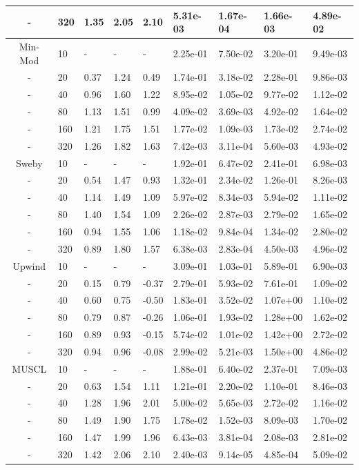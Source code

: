 \begin{table}[htbp]
{\begin{tabular}{cllllllll}
    -  & 320 & 1.35 & 2.05 & 2.10 &  5.31e-03 & 1.67e-04 & 1.66e-03 & 4.89e-02\\ 
   \hline
    Min-Mod &  10 & - & - & - &  2.25e-01 & 7.50e-02 & 3.20e-01 & 9.49e-03\\ 
    - &  20 & 0.37 & 1.24 & 0.49 &  1.74e-01 & 3.18e-02 & 2.28e-01 & 9.86e-03\\ 
    - &  40 & 0.96 & 1.60 & 1.22 &  8.95e-02 & 1.05e-02 & 9.77e-02 & 1.12e-02\\ 
    - &  80 & 1.13 & 1.51 & 0.99 &  4.09e-02 & 3.69e-03 & 4.92e-02 & 1.64e-02\\ 
    - & 160 & 1.21 & 1.75 & 1.51 &  1.77e-02 & 1.09e-03 & 1.73e-02 & 2.74e-02\\ 
    - & 320 & 1.26 & 1.82 & 1.63 &  7.42e-03 & 3.11e-04 & 5.60e-03 & 4.93e-02\\ 
   \hline
    Sweby &  10 & - & - & - &  1.92e-01 & 6.47e-02 & 2.41e-01 & 6.98e-03\\ 
    - &  20 & 0.54 & 1.47 & 0.93 &  1.32e-01 & 2.34e-02 & 1.26e-01 & 8.26e-03\\ 
    - &  40 & 1.14 & 1.49 & 1.09 &  5.97e-02 & 8.34e-03 & 5.94e-02 & 1.11e-02\\ 
    - &  80 & 1.40 & 1.54 & 1.09 &  2.26e-02 & 2.87e-03 & 2.79e-02 & 1.65e-02\\ 
    - & 160 & 0.94 & 1.55 & 1.06 &  1.18e-02 & 9.84e-04 & 1.34e-02 & 2.80e-02\\ 
    - & 320 & 0.89 & 1.80 & 1.57 &  6.38e-03 & 2.83e-04 & 4.50e-03 & 4.96e-02\\ 
   \hline
    Upwind &  10 & - & - & - &  3.09e-01 & 1.03e-01 & 5.89e-01 & 6.90e-03\\ 
    - &  20 & 0.15 & 0.79 & -0.37&  2.79e-01 & 5.93e-02 & 7.61e-01 & 1.09e-02\\ 
    - &  40 & 0.60 & 0.75 & -0.50&  1.83e-01 & 3.52e-02 & 1.07e+00 & 1.10e-02\\ 
    - &  80 & 0.79 & 0.87 & -0.26&  1.06e-01 & 1.93e-02 & 1.28e+00 & 1.62e-02\\ 
    - & 160 & 0.89 & 0.93 & -0.15&  5.74e-02 & 1.01e-02 & 1.42e+00 & 2.72e-02\\ 
    - & 320 & 0.94 & 0.96 & -0.08&  2.99e-02 & 5.21e-03 & 1.50e+00 & 4.86e-02\\ 
   \hline
    MUSCL &  10 & - & - & - &  1.88e-01 & 6.40e-02 & 2.37e-01 & 7.09e-03\\ 
    - &  20 & 0.63 & 1.54 & 1.11 &  1.21e-01 & 2.20e-02 & 1.10e-01 & 8.46e-03\\ 
    - &  40 & 1.28 & 1.96 & 2.01 &  5.00e-02 & 5.65e-03 & 2.72e-02 & 1.16e-02\\ 
    - &  80 & 1.49 & 1.90 & 1.75 &  1.78e-02 & 1.52e-03 & 8.09e-03 & 1.70e-02\\ 
    - & 160 & 1.47 & 1.99 & 1.96 &  6.43e-03 & 3.81e-04 & 2.08e-03 & 2.81e-02\\ 
    - & 320 & 1.42 & 2.06 & 2.10 &  2.40e-03 & 9.14e-05 & 4.85e-04 & 5.09e-02\\ 
   \hline
   \end{tabular}
   }
\end{table}


